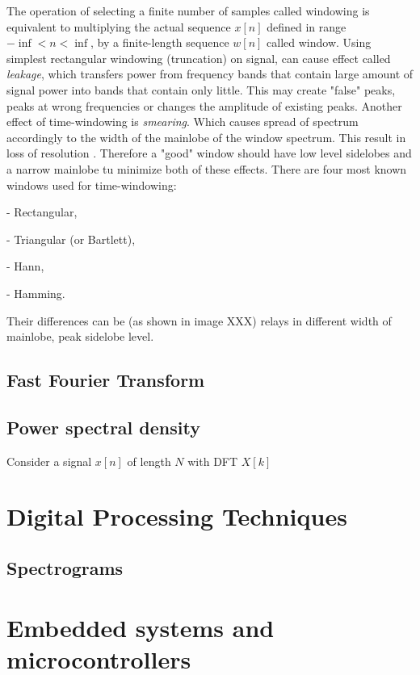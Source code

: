 \documentclass[twoside]{ctuthesis}
\theoremstyle{plain}
\theoremstyle{definition}
\theoremstyle{note}
\begin{document}
The operation of selecting a finite number of samples called windowing is equivalent to multiplying the actual sequence $x[n]$ defined in range $-\inf < n < \inf$, by a finite-length sequence $w[n]$ called window. Using simplest rectangular windowing (truncation) on signal, can cause effect called \textit{leakage}, which transfers power from frequency bands that contain large amount of signal power into bands that contain only little. This may create "false" peaks, peaks at wrong frequencies or changes the amplitude of existing peaks. Another effect of time-windowing is \textit{smearing}. Which causes spread of spectrum accordingly to the width of the mainlobe of the window spectrum. This result in loss of resolution \cite{cite:3} .
Therefore a "good" window should have low level sidelobes and a narrow mainlobe tu minimize both of these effects. There are four most known windows used for time-windowing: 

	- Rectangular,
	
	- Triangular (or Bartlett),
	
	- Hann,
	
	- Hamming.
	
Their differences can be (as shown in image XXX) relays in different width of mainlobe, peak sidelobe level.

\subsection{Fast Fourier Transform}
\subsection{Power spectral density}
Consider a signal $x[n]$ of length $N$ with DFT $X[k]$
\section{Digital Processing Techniques}

\subsection{Spectrograms}

\section{Embedded systems and microcontrollers}
\end{document}
